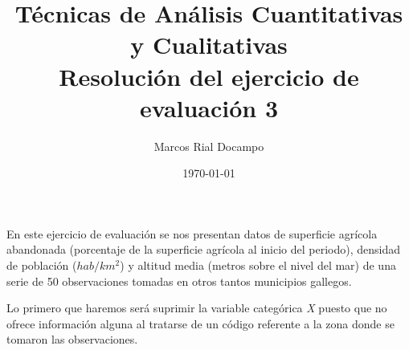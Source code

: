 \documentclass[11pt,a4paper]{article}
\author{Marcos Rial Docampo}
\title{Técnicas de Análisis Cuantitativas y Cualitativas\\Resolución del ejercicio de evaluación 3}
\date{\small{\today}}
\begin{document}
\maketitle

En este ejercicio de evaluación se nos presentan datos de superficie agrícola abandonada (porcentaje de la superficie agrícola al inicio del periodo), densidad de población ($hab/km^{2}$) y altitud media (metros sobre el nivel del mar) de una serie de 50 observaciones tomadas en otros tantos municipios gallegos.

Lo primero que haremos será suprimir la variable categórica \textit{X} puesto que no ofrece información alguna al tratarse de un código referente a la zona donde se tomaron las observaciones.
\end{document}
